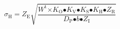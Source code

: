 \[{\sigma }_{\mathrm{H}}\mathrm{=}Z_{\mathrm{E}}\sqrt{\frac{W^{\mathrm{t}}{\mathrm{\times }K}_{\mathrm{O}}{\mathrm{\bullet }K}_{\mathrm{V}}\mathrm{\bullet }K_{\mathrm{S}}\mathrm{\bullet }K_{\mathrm{H}}\mathrm{\bullet }Z_{\mathrm{R}}}{D_{\mathrm{P}}\mathrm{\bullet }b\mathrm{\bullet }Z_{\mathrm{I}}}}\] 